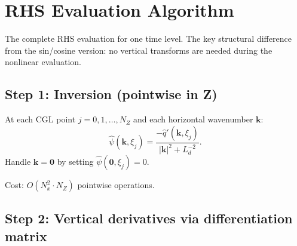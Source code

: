 \documentclass[11pt]{article}
\newcommand{\Ld}{L_d}
\newcommand{\kh}{|\bm{k}|}
\newcommand{\hhat}[1]{\widehat{#1}}
\newcommand{\Dvec}{\bm{D}}
\begin{document}



\section{RHS Evaluation Algorithm}
\label{sec:algorithm}

The complete RHS evaluation for one time level. The key structural difference from the sin/cosine version: no vertical transforms are needed during the nonlinear evaluation.

\subsection{Step 1: Inversion (pointwise in Z)}
At each CGL point $j = 0, 1, \ldots, N_Z$ and each horizontal wavenumber $\bm{k}$:
\begin{equation}
\hhat\psi(\bm{k}, \xi_j) = \frac{-\hhat{q}'(\bm{k}, \xi_j)}{\kh^2 + \Ld^{-2}}.
\end{equation}
Handle $\bm{k} = \bm{0}$ by setting $\hhat\psi(\bm{0}, \xi_j) = 0$.

Cost: $O(N_x^2 \cdot N_Z)$ pointwise operations.

\subsection{Step 2: Vertical derivatives via differentiation matrix}
\end{document}
